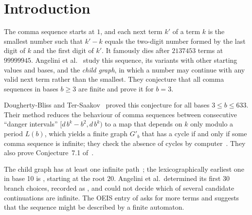\section{Introduction}

The comma sequence  starts at $1$, and each next term $k'$ of a term $k$ is the
smallest number such that $k' - k$ equals the two-digit number formed by the last digit of $k$ and
the first digit of $k'$. It famously dies after $2137453$ terms at $99999945$. Angelini et
al.~\cite{comma} study this sequence, its variants with other starting values and bases, and the
\emph{child graph}, in which a number may continue with any valid next term rather than the
smallest. They conjecture that all comma sequences in bases $b \ge 3$ are finite and prove it for
$b = 3$.

Dougherty-Bliss and Ter-Saakov~\cite{dbts} proved this conjecture for all bases $3 \le b \le 633$.
Their method reduces the behaviour of comma sequences between consecutive ``danger intervals''
$[d\, b^k - b^2, d\, b^k)$ to a map that depends on $k$ only modulo a period $L(b)$, which yields a
finite graph $G'_b$ that has a cycle if and only if some comma sequence is infinite; they check the
absence of cycles by computer~\cite{dbtscode}. They also prove Conjecture~7.1 of~\cite{comma}.

The child graph has at least one infinite path~\cite[Theorem~5.6]{comma}; the lexicographically
earliest one in base 10 is , starting at the root $20$. Angelini et al.\ determined
its first $30$ branch choices, recorded as , and could not decide which of several
candidate continuations are infinite. The OEIS entry of  asks for more terms and
suggests that the sequence might be described by a finite automaton.

